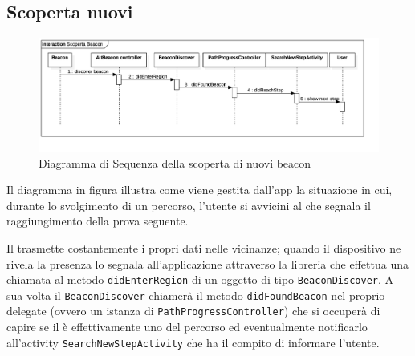 \subsection{Scoperta nuovi }
\label{sub:Scoperta nuovi Beacon}

\begin{figure}[!h]
	\centering
   \includegraphics[scale=0.22]{img/diagrammiSequenza/scopertaBeacon.png}
   \caption{Diagramma di Sequenza della scoperta di nuovi beacon}
\end{figure}

Il diagramma in figura illustra come viene gestita dall'app la situazione in cui, durante lo svolgimento di un percorso, l'utente si avvicini al  che segnala il raggiungimento della prova seguente.

Il  trasmette costantemente i propri dati nelle vicinanze; quando il dispositivo ne rivela la presenza lo segnala all'applicazione attraverso la libreria  che effettua una chiamata al metodo \texttt{didEnterRegion} di un oggetto di tipo \texttt{BeaconDiscover}.
A sua volta il \texttt{BeaconDiscover} chiamerà il metodo \texttt{didFoundBeacon} nel proprio delegate (ovvero un istanza di \texttt{PathProgressController}) che si occuperà di capire se il  è effettivamente uno del percorso ed eventualmente notificarlo all'activity \texttt{SearchNewStepActivity} che ha il compito di informare l'utente.

